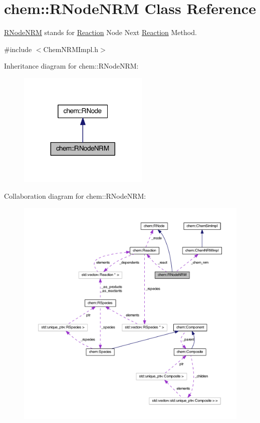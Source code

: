 \hypertarget{classchem_1_1RNodeNRM}{\section{chem\-:\-:R\-Node\-N\-R\-M Class Reference}
\label{classchem_1_1RNodeNRM}
}


\hyperlink{classchem_1_1RNodeNRM}{R\-Node\-N\-R\-M} stands for \hyperlink{classchem_1_1Reaction}{Reaction} Node Next \hyperlink{classchem_1_1Reaction}{Reaction} Method.  




{\ttfamily \#include $<$Chem\-N\-R\-M\-Impl.\-h$>$}



Inheritance diagram for chem\-:\-:R\-Node\-N\-R\-M\-:\nopagebreak
\begin{figure}[H]
\begin{center}
\leavevmode
\includegraphics[width=176pt]{classchem_1_1RNodeNRM__inherit__graph}
\end{center}
\end{figure}


Collaboration diagram for chem\-:\-:R\-Node\-N\-R\-M\-:
\nopagebreak
\begin{figure}[H]
\begin{center}
\leavevmode
\includegraphics[width=350pt]{classchem_1_1RNodeNRM__coll__graph}
\end{center}
\end{figure}
